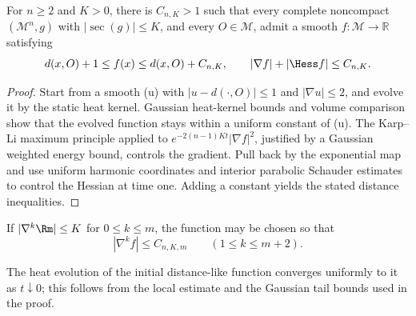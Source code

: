 \begin{proposition}
\label{prop:chow-iii-distance-like-function-bounded-derivatives}
For \(n\ge2\) and \(K>0\), there is \(C_{n,K}>1\) such that every complete
noncompact \((\mathcal M^n,g)\) with \( |\sec(g)|\le K\), and every
\(O\in\mathcal M\), admit a smooth \(f:\mathcal M\to\mathbb R\) satisfying
\[
 d(x,O)+1\le f(x)\le d(x,O)+C_{n,K},
 \qquad |\nabla f|+|\Hess f|\le C_{n,K}.
\]
\end{proposition}
\begin{proof}
\sketch Start from a smooth (u) with \(|u-d(\cdot,O)|\le1\) and
\(|\nabla u|\le2\), and evolve it by the static heat kernel.  Gaussian
heat-kernel bounds and volume comparison show that the evolved function stays
within a uniform constant of (u).  The Karp--Li maximum principle applied
to \(e^{-2(n-1)Kt}|\nabla f|^2\), justified by a Gaussian weighted energy
bound, controls the gradient.  Pull back by the exponential map and use
uniform harmonic coordinates and interior parabolic Schauder estimates to
control the Hessian at time one.  Adding a constant yields the stated
distance inequalities.
\end{proof}

\begin{remark}
\label{rem:chow-iii-distance-like-function-higher-derivatives}
If \(|\nabla^k\Rm|\le K\) for \(0\le k\le m\), the function may be chosen so
that
\[
 |\nabla^kf|\le C_{n,K,m}\qquad(1\le k\le m+2).
\]
\end{remark}

\begin{remark}
\label{rem:chow-iii-distance-like-heat-evolution-uniform-convergence}
The heat evolution of the initial distance-like function converges uniformly
to it as \(t\downarrow0\); this follows from the local estimate and the
Gaussian tail bounds used in the proof.
\end{remark}


